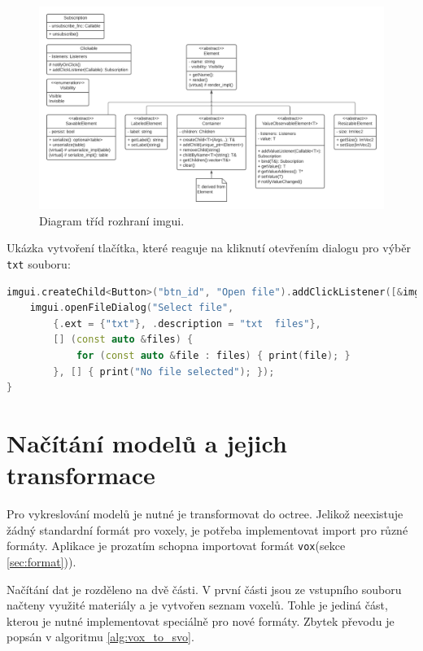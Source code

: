 \begin{figure}[H]
	\centering
	\includegraphics[scale=0.5]{obrazky-figures/pfimgui_classes.pdf}
	\caption{Diagram tříd rozhraní imgui.}
	\label{fig:imgui_classes}
\end{figure}


Ukázka vytvoření tlačítka, které reaguje na kliknutí otevřením dialogu pro výběr \texttt{txt} souboru:

\begin{lstlisting}[language=C++, caption={Tvorba logického zařízení}]
imgui.createChild<Button>("btn_id", "Open file").addClickListener([&imgui] {
    imgui.openFileDialog("Select file", 
        {.ext = {"txt"}, .description = "txt  files"}, 
        [] (const auto &files) {
            for (const auto &file : files) { print(file); }
        }, [] { print("No file selected"); });
}
\end{lstlisting}


\section{Načítání modelů a jejich transformace} \label{sec:voxel_conversion}
Pro vykreslování modelů je nutné je transformovat do octree. Jelikož neexistuje žádný standardní formát pro voxely, je potřeba implementovat import pro různé formáty. Aplikace je prozatím schopna importovat formát \texttt{vox}(sekce \ref{sec:format})). 

Načítání dat je rozděleno na dvě části. V první části jsou ze vstupního souboru načteny využité materiály a je vytvořen seznam voxelů. Tohle je jediná část, kterou je nutné implementovat speciálně pro nové formáty. Zbytek převodu je popsán v algoritmu \ref{alg:vox_to_svo}.


